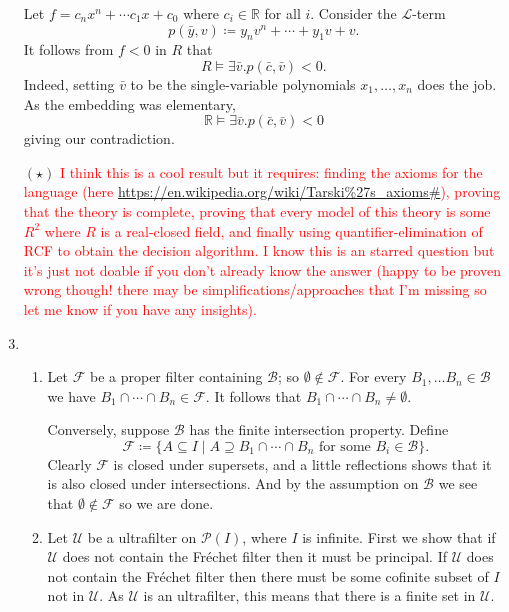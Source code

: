 \documentclass{article}
\theoremstyle{theorem}
\begin{document}
\begin{enumerate}[leftmargin=*]
		Let $f = c_nx^n + \cdots c_1x + c_0$ where $c_i\in \mathbb{R}$ for all $i$. Consider the $\mathcal{L}$-term
		\[
		p(\bar{y},v) \coloneqq y_nv^n + \cdots + y_{1}v + v.
		\]
		It follows from $f<0$ in $R$ that
		\[
			R \models \exists \bar{v}. p(\bar{c},\bar{v}) <0.
		\]
		Indeed, setting $\bar{v}$ to be the single-variable polynomials $x_1,\ldots, x_n$ does the job. As the embedding was elementary,
		\[
			\mathbb{R} \models \exists \bar{v}. p(\bar{c},\bar{v}) <0
		\]	
		giving our contradiction.
		\item[$(\star)$] \textcolor{red}{I think this is a cool result but it requires: finding the axioms for the language (here \url{https://en.wikipedia.org/wiki/Tarski\%27s_axioms#}), proving that the theory is complete, proving that every model of this theory is some $R^2$ where $R$ is a real-closed field, and finally using quantifier-elimination of RCF to obtain the decision algorithm. I know this is an starred question but it's just not doable if you don't already know the answer (happy to be proven wrong though! there may be simplifications/approaches that I'm missing so let me know if you have any insights).}
		\item 
		\begin{enumerate}
			\item Let $\mathcal{F}$ be a proper filter containing $\mathcal{B}$; so $\emptyset\notin \mathcal{F}$. For every $B_1,\ldots B_n\in \mathcal{B}$ we have $B_1\cap \cdots \cap B_n\in \mathcal{F}$. It follows that $B_1\cap \cdots \cap B_n \neq \emptyset$.
			
			Conversely, suppose $\mathcal{B}$ has the finite intersection property. Define
			\[
				\mathcal{F} \coloneqq \{A \subseteq I \mid A \supseteq B_1 \cap \cdots \cap B_n \text{ for some }B_i\in \mathcal{B}\}.
			\]
			Clearly $\mathcal{F}$ is closed under supersets, and a little reflections shows that it is also closed under intersections. And by the assumption on $\mathcal{B}$ we see that $\emptyset\notin \mathcal{F}$ so we are done.
			
			\item Let $\mathcal{U}$ be a ultrafilter on $\mathcal{P}(I)$, where $I$ is infinite. First we show that if $\mathcal{U}$ does not contain the Fréchet filter then it must be principal. If $\mathcal{U}$ does not contain the Fréchet filter then there must be some cofinite subset of $I$ not in $\mathcal{U}$. As $\mathcal{U}$ is an ultrafilter, this means that there is a finite set in $\mathcal{U}$.
			

\end{enumerate}
\end{enumerate}
\end{document}
